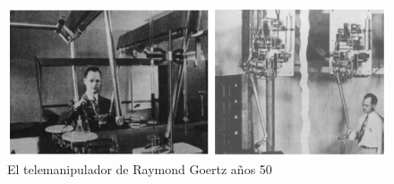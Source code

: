 \begin{figure}[ht!]
\includegraphics[scale=0.6]{FiguresSoA/Goertz}
\caption{El telemanipulador de Raymond Goertz años 50}
\label{Goertz}
\end{figure}














